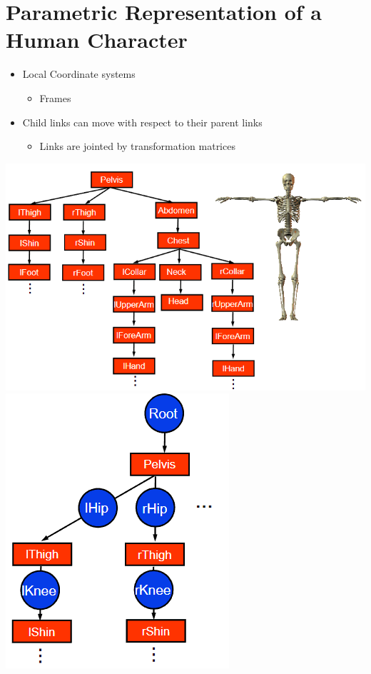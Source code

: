 \documentclass{article}
\begin{document}
\section*{Parametric Representation of a Human Character}
\begin{itemize}
    \item Local Coordinate systems
    \begin{itemize}
        \item Frames
    \end{itemize}
    \item Child links can move with respect to their parent links
    \begin{itemize}
        \item Links are jointed by transformation matrices
    \end{itemize}
\end{itemize}
\begin{center}
    \includegraphics*[scale=0.6]{W7_10.png}
    \includegraphics*[scale=0.6]{W7_11.png}
\end{center}
\end{document}
